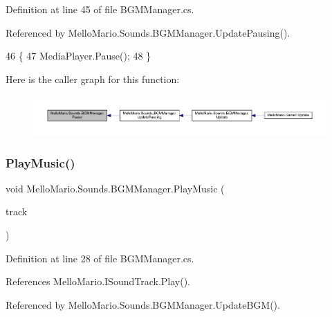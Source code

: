 Definition at line 45 of file B\+G\+M\+Manager.\+cs.



Referenced by Mello\+Mario.\+Sounds.\+B\+G\+M\+Manager.\+Update\+Pausing().


\begin{DoxyCode}
46         \{
47             MediaPlayer.Pause();
48         \}
\end{DoxyCode}
Here is the caller graph for this function\+:
\nopagebreak
\begin{figure}[H]
\begin{center}
\leavevmode
\includegraphics[width=350pt]{classMelloMario_1_1Sounds_1_1BGMManager_a7cb559fc36af65d0276c72dd9387568f_icgraph}
\end{center}
\end{figure}
\mbox{\label{classMelloMario_1_1Sounds_1_1BGMManager_ae9869dc2745c334f5a7d0ab0d34e92e3}} 
\subsubsection{Play\+Music()}
{\footnotesize\ttfamily void Mello\+Mario.\+Sounds.\+B\+G\+M\+Manager.\+Play\+Music (\begin{DoxyParamCaption}\item[{\textbf{ I\+Sound\+Track}}]{track }\end{DoxyParamCaption})\hspace{0.3cm}{\ttfamily [private]}}



Definition at line 28 of file B\+G\+M\+Manager.\+cs.



References Mello\+Mario.\+I\+Sound\+Track.\+Play().



Referenced by Mello\+Mario.\+Sounds.\+B\+G\+M\+Manager.\+Update\+B\+G\+M().


